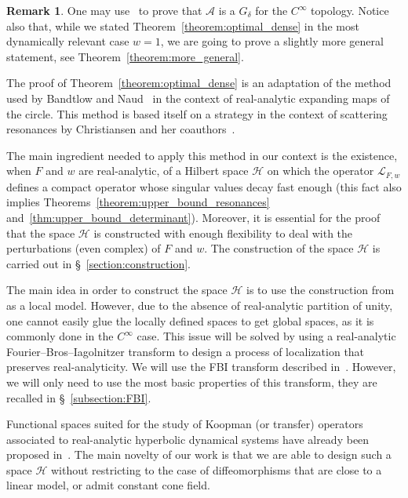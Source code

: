 \documentclass[10pt]{amsart}
\theoremstyle{definition}\newtheorem{defi}[theo]{Definition}\newtheorem{rema}[theo]{Remark}\newtheorem{exam}[theo]{Example}\newtheorem{exem}[theo]{Example}\newtheorem{nota}[theo]{Notation}
\newcommand{\clL}{\mathcal{L}}
\newcommand{\clA}{\mathcal{A}}
\newcommand{\clH}{\mathcal{H}}
\begin{document}
\begin{rema}
One may use~\cite[Theorem~2.7]{gouezel_liverani_1} to prove that $\clA$ is a $G_\delta$ for the $C^\infty$ topology. Notice also that, while we stated Theorem~\ref{theorem:optimal_dense} in the most dynamically relevant case $w = 1$, we are going to prove a slightly more general statement, see Theorem~\ref{theorem:more_general}.
\end{rema}

The proof of Theorem~\ref{theorem:optimal_dense} is an adaptation of the method used by Bandtlow and Naud~\cite{bandtlow_naud} in the context of real-analytic expanding maps of the circle. This method is based itself on a strategy in the context of scattering resonances by Christiansen and her coauthors~\cite{christiansen_hyperbolic,
christiansen_potential,
christiansen_schrodinger,
christiansen_several,
christiansen_euclidean}.

The main ingredient needed to apply this method in our context is the existence, when $F$ and $w$ are real-analytic, of a Hilbert space $\clH$ on which the operator $\clL_{F,w}$ defines a compact operator whose singular values decay fast enough (this fact also implies Theorems~\ref{theorem:upper_bound_resonances} and~\ref{thm:upper_bound_determinant}). Moreover, it is essential for the proof that the space $\clH$ is constructed with enough flexibility to deal with the perturbations (even complex) of $F$ and $w$. The construction of the space $\clH$ is carried out in \S~\ref{section:construction}.

The main idea in order to construct the space $\clH$ is to use the construction from~\cite{faure_roy} as a local model. However, due to the absence of real-analytic partition of unity, one cannot easily glue the locally defined spaces to get global spaces, as it is commonly done in the $C^\infty$ case. This issue will be solved by using a real-analytic Fourier--Bros--Iagolnitzer transform to design a process of localization that preserves real-analyticity. We will use the FBI transform described in~\cite{BJ20}. However, we will only need to use the most basic properties of this transform, they are recalled in \S~\ref{subsection:FBI}.

Functional spaces suited for the study of Koopman (or transfer) operators associated to real-analytic hyperbolic dynamical systems have already been proposed in~\cite{faure_roy,other_example,first_example,
optimal_examples}. The main novelty of our work is that we are able to design such a space $\clH$ without restricting to the case of diffeomorphisms that are close to a linear model, or admit constant cone field.
\end{document}
